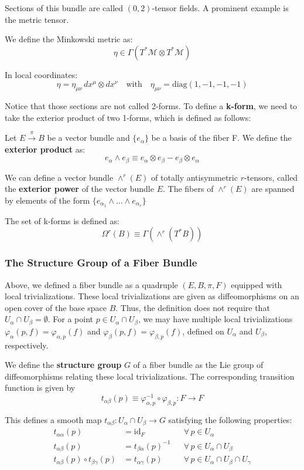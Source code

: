 Sections of this bundle are called \((0,2)\)-tensor fields. A prominent example is the metric tensor.

We define the Minkowski metric as:
\[
\eta \in \Gamma(T^*\mathcal{M} \otimes T^*\mathcal{M})
\]

In local coordinates:
\[
\eta = \eta_{\mu\nu} \, dx^\mu \otimes dx^\nu
\quad \text{with} \quad \eta_{\mu\nu} = \text{diag}(1, -1, -1, -1)
\]

Notice that those sections are not called 2-forms. To define a \textbf{k-form}, we need to take the exterior product of two 1-forms, which is defined as follows:

Let $E \xrightarrow{\pi} B$ be a vector bundle and $\{e_\alpha\}$ be a basis of the fiber F. We define the \textbf{exterior product} as:
\[e_\alpha \wedge e_\beta \equiv e_\alpha \otimes e_\beta - e_\beta \otimes e_\alpha\]


We can define a vector bundle \( \wedge^r (E) \) of totally antisymmetric \( r \)-tensors, called the \textbf{exterior power} of the vector bundle \( E \). The fibers of \( \wedge^r (E) \) are spanned by elements of the form $\{ e_{\alpha_1} \wedge \dots \wedge e_{\alpha_r} \}$
 
The set of k-forms is defined as:
\[\Omega^r(B) \equiv \Gamma(\wedge^r (T^*B))\]



\subsubsection*{The Structure Group of a Fiber Bundle}

Above, we defined a fiber bundle as a quadruple $(E, B, \pi, F)$ equipped with local trivializations. These local trivializations are given as diffeomorphisms on an open cover of the base space $B$. Thus, the definition does not require that $U_\alpha \cap U_\beta = \emptyset$. For a point $p \in U_\alpha \cap U_\beta$, we may have multiple local trivializations $\varphi_\alpha(p, f) = \varphi_{\alpha,p}(f)$ and $\varphi_\beta(p, f) = \varphi_{\beta,p}(f)$, defined on $U_\alpha$ and $U_\beta$, respectively. 

We define the \textbf{structure group} $G$ of a fiber bundle as the Lie group of diffeomorphisms relating these local trivializations. The corresponding transition function is given by
\[
t_{\alpha\beta}(p) \equiv \varphi_{\alpha,p}^{-1} \circ \varphi_{\beta,p} : F \to F
\]

This defines a smooth map $t_{\alpha\beta}: U_\alpha \cap U_\beta \to G$ satisfying the following properties:
\begin{align*}
  t_{\alpha \alpha}(p) &= \mathrm{id}_F && \forall\, p \in U_\alpha \\
  t_{\alpha\beta}(p) &= t_{\beta\alpha}(p)^{-1} && \forall\, p \in U_\alpha \cap U_\beta \\
  t_{\alpha\beta}(p) \circ t_{\beta\gamma}(p) &= t_{\alpha\gamma}(p) && \forall\, p \in U_\alpha \cap U_\beta \cap U_\gamma
\end{align*}

